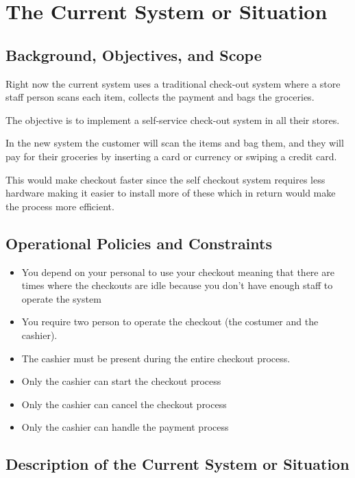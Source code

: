 \section{The Current System or Situation}

\subsection{Background, Objectives, and Scope}

Right now the current system uses a traditional check-out system where a store 
staff person scans each item, collects the payment 
and bags the groceries. \newline

\noindent 
The objective is to implement a self-service check-out system in all 
their stores.\newline

\noindent 
In the new system the customer will scan the items and bag them, 
and they will pay for their groceries by inserting a card or currency 
or swiping a credit card. \newline

\noindent 
This would make checkout faster since the self checkout system 
requires less hardware making it easier to install more of these which in 
return would make the process more efficient.

\subsection{Operational Policies and Constraints}
\begin{itemize}
	\item You depend on your personal to use your checkout meaning that 
	there are times where the checkouts are idle because you don't have 
	enough staff to operate the system
	\item You require two person to operate the checkout (the costumer 
	and the cashier).
	\item The cashier must be present during the entire checkout process.
	\item Only the cashier can start the checkout process
	\item Only the cashier can cancel the checkout process
	\item Only the cashier can handle the payment process
\end{itemize}

\pagebreak

\subsection{Description of the Current System or Situation}

